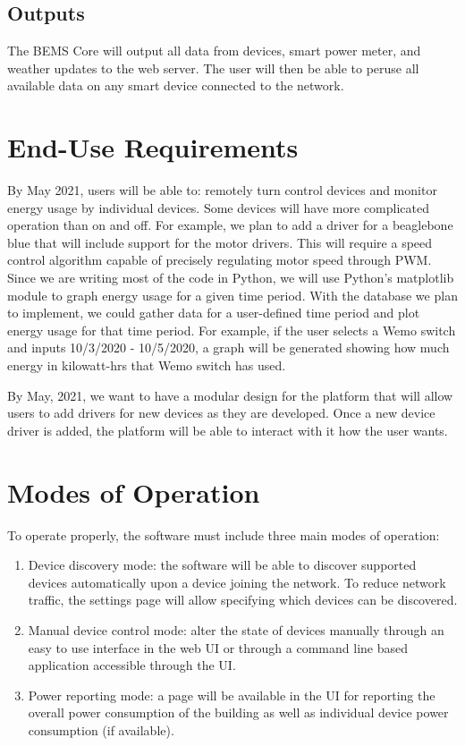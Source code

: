 \documentclass[12pt]{article} %
\begin{document}
\subsection{Outputs}
The BEMS Core will output all data from devices, smart power meter, and weather updates to the web server. The user will then be able to peruse all available data on any smart device connected to the network.
\section{End-Use Requirements}
By May 2021, users will be able to: remotely turn control devices and monitor energy usage by individual devices.
\medbreak\noindent
Some devices will have more complicated operation than on and off. For example, we plan to add a driver for a beaglebone blue that will include support for the motor drivers. This will require a speed control algorithm capable of precisely regulating motor speed through PWM.
\medbreak\noindent
Since we are writing most of the code in Python, we will use Python's matplotlib module to graph energy usage for a given time period. With the database we plan to implement, we could gather data for a user-defined time period and plot energy usage for that time period. For example, if the user selects a Wemo switch and inputs 10/3/2020 - 10/5/2020, a graph will be generated showing how much energy in kilowatt-hrs that Wemo switch has used.

By May, 2021, we want to have a modular design for the platform that will allow users to add drivers for new devices as they are developed. Once a new device driver is added, the platform will be able to interact with it how the user wants.

\section{Modes of Operation}
To operate properly, the software must include three main modes of operation:
\indent
\begin{enumerate}[leftmargin=*,start=0,label={\bfseries Mode~\#\arabic*:}]
    \item Device discovery mode: the software will be able to discover supported devices automatically upon a device joining the network. To reduce network traffic, the settings page will allow specifying which devices can be discovered.
    \item Manual device control mode: alter the state of devices manually through an easy to use interface in the web UI or through a command line based application accessible through the UI.
    \item Power reporting mode: a page will be available in the UI for reporting the overall power consumption of the building as well as individual device power consumption (if available). 
\end{enumerate}
\end{document}
